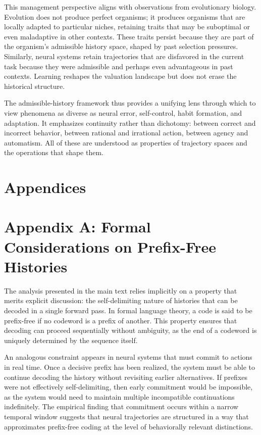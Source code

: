 \documentclass[11pt]{article}
\begin{document}
This management perspective aligns with observations from evolutionary biology. Evolution does not produce perfect organisms; it produces organisms that are locally adapted to particular niches, retaining traits that may be suboptimal or even maladaptive in other contexts. These traits persist because they are part of the organism’s admissible history space, shaped by past selection pressures. Similarly, neural systems retain trajectories that are disfavored in the current task because they were admissible and perhaps even advantageous in past contexts. Learning reshapes the valuation landscape but does not erase the historical structure.

The admissible-history framework thus provides a unifying lens through which to view phenomena as diverse as neural error, self-control, habit formation, and adaptation. It emphasizes continuity rather than dichotomy: between correct and incorrect behavior, between rational and irrational action, between agency and automatism. All of these are understood as properties of trajectory spaces and the operations that shape them.

\section*{Appendices}

\section{Appendix A: Formal Considerations on Prefix-Free Histories}

The analysis presented in the main text relies implicitly on a property that merits explicit discussion: the self-delimiting nature of histories that can be decoded in a single forward pass. In formal language theory, a code is said to be prefix-free if no codeword is a prefix of another. This property ensures that decoding can proceed sequentially without ambiguity, as the end of a codeword is uniquely determined by the sequence itself.

An analogous constraint appears in neural systems that must commit to actions in real time. Once a decisive prefix has been realized, the system must be able to continue decoding the history without revisiting earlier alternatives. If prefixes were not effectively self-delimiting, then early commitment would be impossible, as the system would need to maintain multiple incompatible continuations indefinitely. The empirical finding that commitment occurs within a narrow temporal window suggests that neural trajectories are structured in a way that approximates prefix-free coding at the level of behaviorally relevant distinctions.
\end{document}
